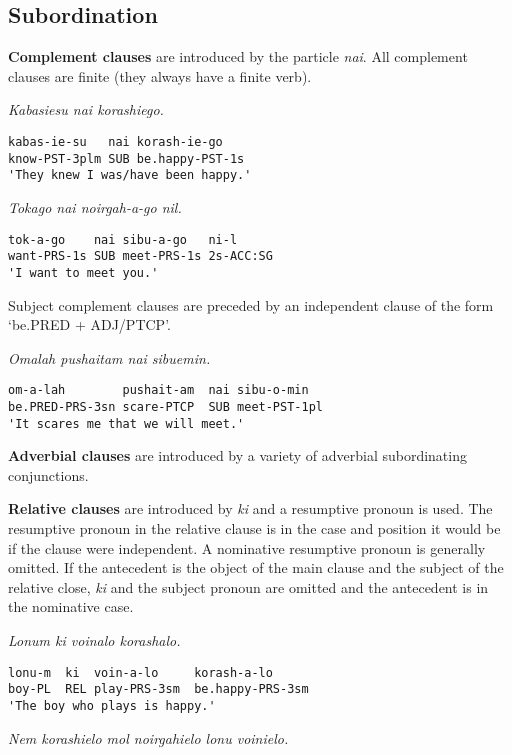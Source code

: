 \documentclass[a4paper,]{article}
\begin{document}
\hypertarget{subordination}{%
\subsection{Subordination}\label{subordination}}

\textbf{Complement clauses} are introduced by the particle \emph{nai}.
All complement clauses are finite (they always have a finite verb).

\emph{Kabasiesu nai korashiego.}

\begin{verbatim}
kabas-ie-su   nai korash-ie-go
know-PST-3plm SUB be.happy-PST-1s
'They knew I was/have been happy.'
\end{verbatim}

\emph{Tokago nai noirgah-a-go nil.}

\begin{verbatim}
tok-a-go    nai sibu-a-go   ni-l
want-PRS-1s SUB meet-PRS-1s 2s-ACC:SG
'I want to meet you.'
\end{verbatim}

Subject complement clauses are preceded by an independent clause of the
form `be.PRED + ADJ/PTCP'.

\emph{Omalah pushaitam nai sibuemin.}

\begin{verbatim}
om-a-lah        pushait-am  nai sibu-o-min
be.PRED-PRS-3sn scare-PTCP  SUB meet-PST-1pl
'It scares me that we will meet.'
\end{verbatim}

\textbf{Adverbial clauses} are introduced by a variety of adverbial
subordinating conjunctions.

\textbf{Relative clauses} are introduced by \emph{ki} and a resumptive
pronoun is used. The resumptive pronoun in the relative clause is in the
case and position it would be if the clause were independent. A
nominative resumptive pronoun is generally omitted. If the antecedent is
the object of the main clause and the subject of the relative close,
\emph{ki} and the subject pronoun are omitted and the antecedent is in
the nominative case.

\emph{Lonum ki voinalo korashalo.}

\begin{verbatim}
lonu-m  ki  voin-a-lo     korash-a-lo
boy-PL  REL play-PRS-3sm  be.happy-PRS-3sm
'The boy who plays is happy.'
\end{verbatim}

\emph{Nem korashielo mol noirgahielo lonu voinielo.}
\end{document}
